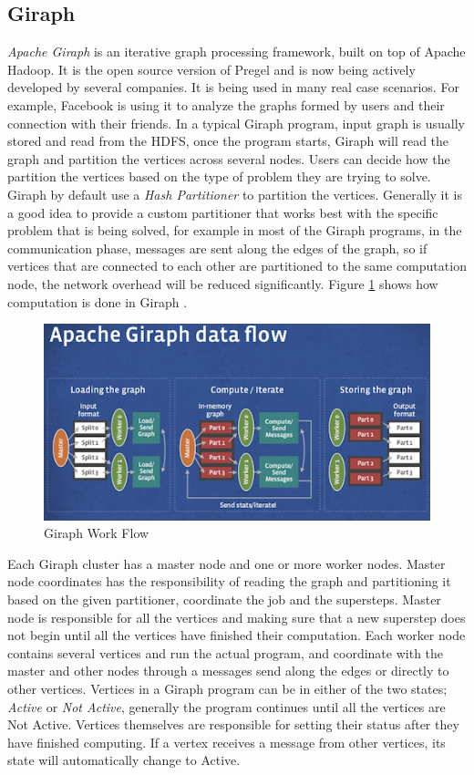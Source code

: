\documentclass[english]{tktltiki}
\begin{document}
\subsection{Giraph}
\textit{Apache Giraph} is an iterative graph processing framework, built on top of Apache Hadoop. It is the open source version of Pregel and is now being actively developed by several companies. It is being used in many real case scenarios. For example, Facebook is using it to analyze the graphs formed by users and their connection with their friends. 
In a typical Giraph program, input graph is usually stored and read from the HDFS, once the program starts, Giraph will read the graph and partition the vertices across several nodes. Users can decide how the partition the vertices based on the type of problem they are trying to solve. Giraph by default use a \textit{Hash Partitioner} to partition the vertices. Generally it is a good idea to provide a custom partitioner that works best with the specific problem that is being solved, for example in most of the Giraph programs, in the communication phase, messages are sent along the edges of the graph, so if vertices that are connected to each other are partitioned to the same computation node, the network overhead will be reduced significantly.    
Figure \ref{fig:giraph} shows how computation is done in Giraph .
\begin{figure}[ht!]
\centering
\includegraphics[width=130mm]{figures/giraphdataflow.png}
\caption{Giraph Work Flow}
\label{fig:giraph}
\end{figure}

Each Giraph cluster has a master node and one or more worker nodes. Master node coordinates has the responsibility of reading the graph and partitioning it based on the given partitioner, coordinate the job and the supersteps. Master node is responsible for  all the vertices and making sure that a new superstep does not begin until all the vertices have finished their computation. Each worker node contains several vertices and run the actual program, and coordinate with the master and other nodes through a messages send along the edges or directly to other vertices. Vertices in a Giraph program can be in either of the two states; \textit{Active} or \textit{Not Active}, generally the program continues until all the vertices are Not Active. Vertices themselves are responsible for setting their status after they have finished computing. If a vertex receives a message from other vertices, its state will automatically change to Active.
\end{document}
